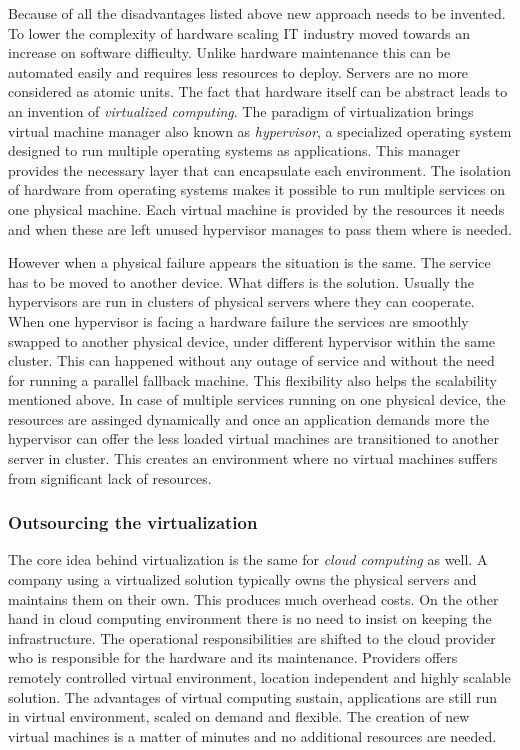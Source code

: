 Because of all the disadvantages listed above new approach needs to be invented. To lower the complexity of hardware scaling IT industry moved towards an increase on software difficulty. Unlike hardware maintenance this can be automated easily and requires less resources to deploy. Servers are no more considered as atomic units. The fact that hardware itself can be abstract leads to an invention of \emph{virtualized computing}. The paradigm of virtualization brings virtual machine manager also known as \emph{hypervisor}, a specialized operating system designed to run multiple operating systems as applications. This manager provides the necessary layer that can encapsulate each environment. The isolation of hardware from operating systems makes it possible to run multiple services on one physical machine. Each virtual machine is provided by the resources it needs and when these are left unused hypervisor manages to pass them where is needed.

However when a physical failure appears the situation is the same. The service has to be moved to another device. What differs is the solution. Usually the hypervisors are run in clusters of physical servers where they can cooperate. When one hypervisor is facing a hardware failure the services are smoothly swapped to another physical device, under different hypervisor within the same cluster. This can happened without any outage of service and without the need for running a parallel fallback machine. This flexibility also helps the scalability mentioned above. In case of multiple services running on one physical device, the resources are assinged dynamically and once an application demands more the hypervisor can offer the less loaded virtual machines are transitioned to another server in cluster. This creates an environment where no virtual machines suffers from significant lack of resources.

\subsubsection{Outsourcing the virtualization}
\label{subs:Outsourcing the virtualization}

The core idea behind virtualization is the same for \emph{cloud computing} as well. A company using a virtualized solution typically owns the physical servers and maintains them on their own. This produces much overhead costs. On the other hand in cloud computing environment there is no need to insist on keeping the infrastructure. The operational responsibilities are shifted to the cloud provider who is responsible for the hardware and its maintenance. Providers offers remotely controlled virtual environment, location independent and highly scalable solution. The advantages of virtual computing sustain, applications are still run in virtual environment, scaled on demand and flexible. The creation of new virtual machines is a matter of minutes and no additional resources are needed.

